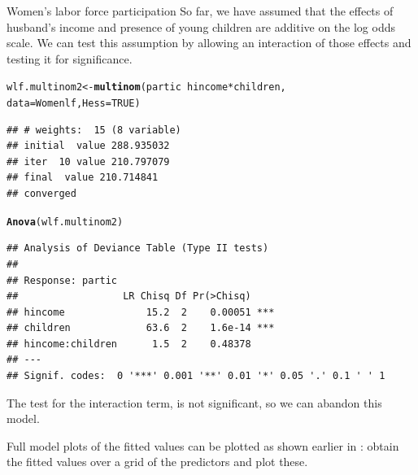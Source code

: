 \documentclass[11pt]{book}\usepackage[]{graphicx}\usepackage[]{color}
\makeatletter
\newcommand{\hlnum}[1]{\textcolor[rgb]{0.686,0.059,0.569}{#1}}%
\newcommand{\hlopt}[1]{\textcolor[rgb]{0,0,0}{#1}}%
\newcommand{\hlstd}[1]{\textcolor[rgb]{0.345,0.345,0.345}{#1}}%
\newcommand{\hlkwb}[1]{\textcolor[rgb]{0.69,0.353,0.396}{#1}}%
\newcommand{\hlkwc}[1]{\textcolor[rgb]{0.333,0.667,0.333}{#1}}%
\newcommand{\hlkwd}[1]{\textcolor[rgb]{0.737,0.353,0.396}{\textbf{#1}}}%
\newenvironment{kframe}{%
 \def\at@end@of@kframe{}%
 \ifinner\ifhmode%
  \def\at@end@of@kframe{\end{minipage}}%
  \begin{minipage}{\columnwidth}%
 \fi\fi%
 \def\FrameCommand##1{\hskip\@totalleftmargin \hskip-\fboxsep
 \colorbox{shadecolor}{##1}\hskip-\fboxsep
     \hskip-\linewidth \hskip-\@totalleftmargin \hskip\columnwidth}%
 \MakeFramed {\advance\hsize-\width
   \@totalleftmargin\z@ \linewidth\hsize
   \@setminipage}}%
 {\par\unskip\endMakeFramed%
 \at@end@of@kframe}
\newenvironment{knitrout}{}{} %
\renewenvironment{knitrout}{\small\renewcommand{\baselinestretch}{.85}}{} %
\makeatother
\begin{document}
\begin{Example}[wlfpart2]{Women's labor force participation}
So far, we have assumed that the effects of husband's income and presence of young children
are additive on the log odds scale.  We can test this assumption by allowing an
interaction of those effects and testing it for significance.  
\begin{knitrout}
\color{fgcolor}\begin{kframe}
\begin{alltt}
\hlstd{wlf.multinom2} \hlkwb{<-} \hlkwd{multinom}\hlstd{(partic} \hlopt{~} \hlstd{hincome} \hlopt{*} \hlstd{children,}
                         \hlkwc{data}\hlstd{=Womenlf,} \hlkwc{Hess}\hlstd{=}\hlnum{TRUE}\hlstd{)}
\end{alltt}
\begin{verbatim}
## # weights:  15 (8 variable)
## initial  value 288.935032 
## iter  10 value 210.797079
## final  value 210.714841 
## converged
\end{verbatim}
\begin{alltt}
\hlkwd{Anova}\hlstd{(wlf.multinom2)}
\end{alltt}
\begin{verbatim}
## Analysis of Deviance Table (Type II tests)
## 
## Response: partic
##                  LR Chisq Df Pr(>Chisq)    
## hincome              15.2  2    0.00051 ***
## children             63.6  2    1.6e-14 ***
## hincome:children      1.5  2    0.48378    
## ---
## Signif. codes:  0 '***' 0.001 '**' 0.01 '*' 0.05 '.' 0.1 ' ' 1
\end{verbatim}
\end{kframe}
\end{knitrout}
\noindent The test for the interaction term,  is not significant,
so we can abandon this model.

Full model plots of the fitted values can be plotted as shown earlier in
: obtain the fitted values over a grid of the
predictors and plot these.


\end{Example}
\end{document}
